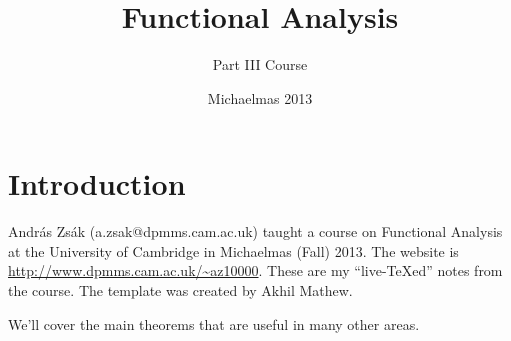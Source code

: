\def\filepath{C:/Users/Owner/Dropbox/Math/templates}








\def\name{Functional Analysis}



\pagestyle{fancy}
\chead{} 
\lfoot{} 
\cfoot{\thepage} 
\rfoot{} %
\renewcommand{\headrulewidth}{.3pt} 
\setlength\voffset{0in}
\setlength\textheight{648pt}


\title{Functional Analysis}
\author{Part III Course}
\date{Michaelmas 2013}
\maketitle

\tableofcontents

\chapter*{Introduction}
Andr\'as Zs\'ak (a.zsak@dpmms.cam.ac.uk) taught a course on Functional Analysis at
the University of Cambridge in Michaelmas (Fall) 2013. The website is \url{http://www.dpmms.cam.ac.uk/\~az10000}.  
These are my ``live-\TeX ed'' notes from the course.  The template was created by Akhil Mathew.




We'll cover the main theorems that are useful in many other areas.

